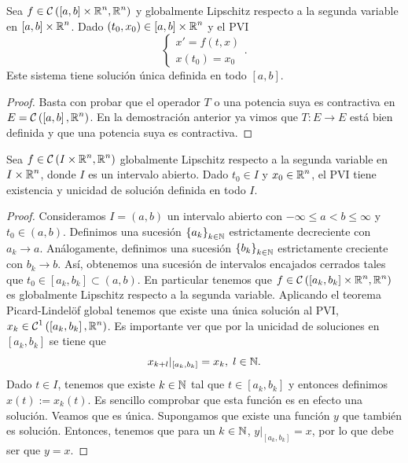 \begin{theorem}
	Sea $\displaystyle f \in \mathcal{C}\left(\left[a,b\right] \times\mathbb{R}^{n}, \mathbb{R}^{n}\right) $ y globalmente Lipschitz respecto a la segunda variable en $\displaystyle \left[a,b\right] \times \mathbb{R}^{n} $. Dado $\displaystyle \left(t_{0}, x_{0}\right) \in \left[a,b\right] \times \mathbb{R}^{n} $ y el PVI
	\[
	\begin{cases}
	x' = f\left(t,x\right)\\
	x\left(t_{0}\right)=x_{0}
	\end{cases}
	.\]
	Este sistema tiene solución única definida en todo $\displaystyle \left[a,b\right]  $. 	
\end{theorem}
\begin{proof}
	Basta con probar que el operador $\displaystyle T $ o una potencia suya es contractiva en $\displaystyle E = \mathcal{C}\left(\left[a,b\right] , \mathbb{R}^{n}\right) $. En la demostración anterior ya vimos que $\displaystyle T : E \to E $ está bien definida y que una potencia suya es contractiva. 
\end{proof}
\begin{colorary}
Sea $\displaystyle f \in \mathcal{C}\left(I \times \mathbb{R}^{n}, \mathbb{R}^{n}\right) $ globalmente Lipschitz respecto a la segunda variable en $\displaystyle I \times \mathbb{R}^{n} $, donde $\displaystyle I $ es un intervalo abierto. Dado $\displaystyle t_{0} \in I $ y $\displaystyle x_{0} \in \mathbb{R}^{n} $, el PVI tiene existencia y unicidad de solución definida en todo $\displaystyle I $.
\end{colorary}
\begin{proof}
	Consideramos $\displaystyle I =\left(a,b\right) $ un intervalo abierto con $\displaystyle -\infty\leq a < b \leq \infty $ y $\displaystyle t_{0} \in \left(a,b\right) $. Definimos una sucesión $\displaystyle \left\{ a_{k}\right\} _{k \in \mathbb{N}} $ estrictamente decreciente con $\displaystyle a_{k}\to a $. Análogamente, definimos una sucesión $\displaystyle \left\{ b_{k}\right\} _{k \in \mathbb{N}} $ estrictamente creciente con $\displaystyle b_{k} \to b $. 
	Así, obtenemos una sucesión de intervalos encajados cerrados tales que $\displaystyle t_{0} \in \left[a_{k}, b_{k}\right] \subset \left(a,b\right) $. En particular tenemos que $\displaystyle f \in \mathcal{C}\left(\left[a_{k}, b_{k}\right] \times \mathbb{R}^{n}, \mathbb{R}^{n}\right) $ es globalmente Lipschitz respecto a la segunda variable. 
	Aplicando el teorema Picard-Lindelöf global tenemos que existe una única solución al PVI, $\displaystyle x_{k} \in \mathcal{C}^{1}\left(\left[a_{k}, b_{k}\right] , \mathbb{R}^{n}\right) $. Es importante ver que por la unicidad de soluciones en $\displaystyle \left[a_{k}, b_{k}\right]  $ se tiene que
	\[x_{k+l}|_{\left[a_{k}, b_{k}\right] }=x_{k}, \; l \in \mathbb{N} .\]
	Dado $\displaystyle t\in I $, tenemos que existe $\displaystyle k \in \mathbb{N} $ tal que $\displaystyle t \in \left[a_{k}, b_{k}\right]  $ y entonces definimos $\displaystyle x\left(t\right):=x_{k}\left(t\right) $. Es sencillo comprobar que esta función es en efecto una solución. Veamos que es única. Supongamos que existe una función $\displaystyle y $ que también es solución. Entonces, tenemos que para un $\displaystyle k \in \mathbb{N} $, $\displaystyle y|_{\left[a_{k}, b_{k}\right] }=x $, por lo que debe ser que $\displaystyle y = x $. 
\end{proof}
